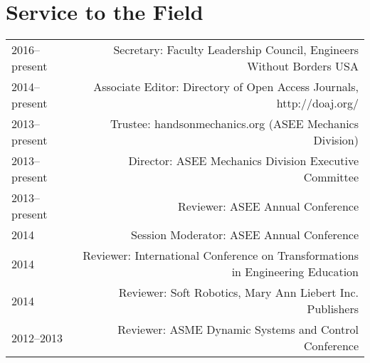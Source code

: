 \section*{Service to the Field}
\begin{tabular}{L!{\VRule}R}
2016--present&Secretary: Faculty Leadership Council, Engineers Without Borders USA\\
2014--present&Associate Editor: Directory of Open Access Journals, http://doaj.org/\\
2013--present&Trustee: handsonmechanics.org (ASEE Mechanics Division)\\
2013--present&Director: ASEE Mechanics Division Executive Committee\\
2013--present&Reviewer: ASEE Annual Conference\\
2014&Session Moderator: ASEE Annual Conference\\
2014&Reviewer: International Conference on Transformations in Engineering Education\\
2014&Reviewer: Soft Robotics, Mary Ann Liebert Inc. Publishers\\
2012--2013&Reviewer: ASME Dynamic Systems and Control Conference\\
\end{tabular}